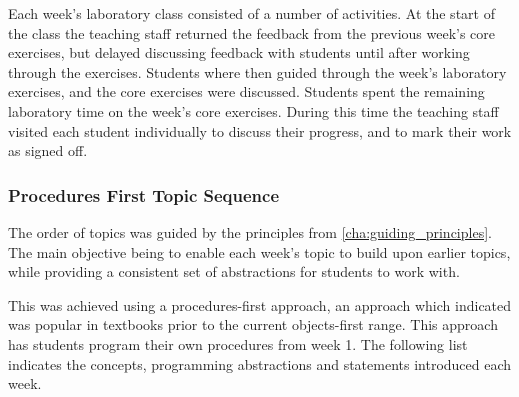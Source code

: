 Each week's laboratory class consisted of a number of activities. At the start of the class the teaching staff returned the feedback from the previous week's core exercises, but delayed discussing feedback with students until after working through the exercises. Students where then guided through the week's laboratory exercises, and the core exercises were discussed. Students spent the remaining laboratory time on the week's core exercises. During this time the teaching staff visited each student individually to discuss their progress, and to mark their work as signed off.


\subsubsection{Procedures First Topic Sequence} %
\label{ssub:procedures_first_topic_sequence}

The order of topics was guided by the principles from \cref{cha:guiding_principles}. The main objective being to enable each week's topic to build upon earlier topics, while providing a consistent set of abstractions for students to work with.

This was achieved using a procedures-first approach, an approach which \citet{Pattis:1990} indicated was popular in textbooks prior to the current objects-first range. This approach has students program their own procedures from week 1. The following list indicates the concepts, programming abstractions and statements introduced each week.

